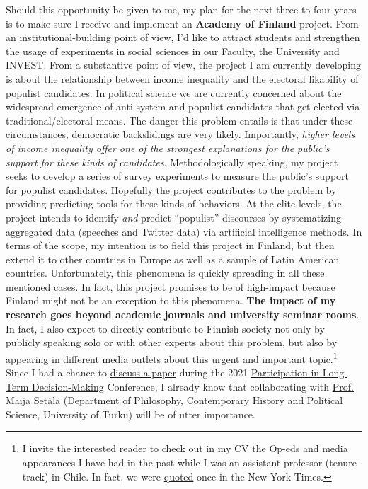 \documentclass[10pt,stdletter,dateno,sigleft]{newlfm} %
\begin{document}
\begin{newlfm}
Should this opportunity be given to me, my plan for the next three to four years is to make sure I receive and implement an {\bf Academy of Finland} project. From an institutional-building point of view, I'd like to attract students and strengthen the usage of experiments in social sciences in our Faculty, the University and INVEST. From a substantive point of view, the project I am currently developing is about the relationship between income inequality and the electoral likability of populist candidates. In political science we are currently concerned about the widespread emergence of anti-system and populist candidates that get elected via traditional/electoral means. The danger this problem entails is that under these circumstances, democratic backslidings are very likely. Importantly, \emph{higher levels of income inequality offer one of the strongest explanations for the public's support for these kinds of candidates}. Methodologically speaking, my project seeks to develop a series of survey experiments to measure the public's support for populist candidates. Hopefully the project contributes to the problem by providing predicting tools for these kinds of behaviors. At the elite levels, the project intends to identify \emph{and} predict ``populist'' discourses by systematizing aggregated data (speeches and Twitter data) via artificial intelligence methods. In terms of the scope, my intention is to field this project in Finland, but then extend it to other countries in Europe as well as a sample of Latin American countries. Unfortunately, this phenomena is quickly spreading in all these mentioned cases. In fact, this project promises to be of high-impact because Finland might not be an exception to this phenomena. {\bf The impact of my research goes beyond academic journals and university seminar rooms}. In fact, I also expect to directly contribute to Finnish society not only by publicly speaking solo or with other experts about this problem, but also by appearing in different media outlets about this urgent and important topic.\footnote{I invite the interested reader to check out in my CV the Op-eds and media appearances I have had in the past while I was an assistant professor (tenure-track) in Chile. In fact, we were \href{https://www.nytimes.com/2021/08/04/opinion/biden-eviction-covid-democrats.html}{quoted} once in the New York Times.} Since I had a chance to \href{https://paloresearch.fi/en/events/}{discuss a paper} during the 2021 \href{https://paloresearch.fi/en/}{Participation in Long-Term Decision-Making} Conference, I already know that collaborating with \href{https://www.utu.fi/en/people/maija-setala}{Prof. Maija Set{\"a}l{\"a}} (Department of Philosophy, Contemporary History and Political Science, University of Turku) will be of utter importance. 


\end{newlfm}
\end{document}
